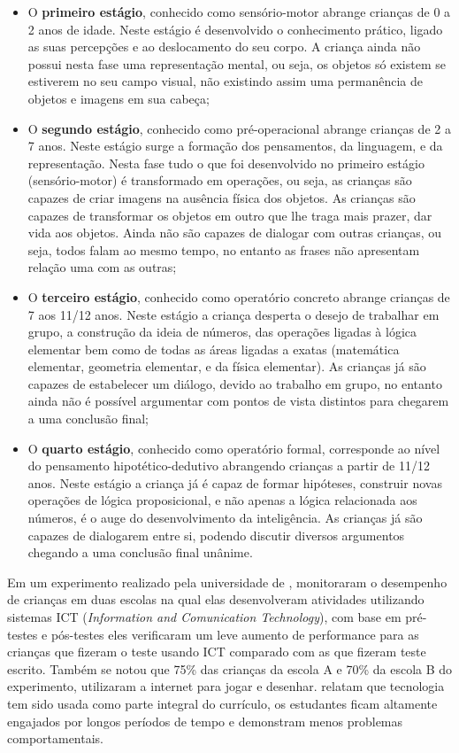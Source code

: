 \begin{itemize}
	\item O \textbf{primeiro estágio}, conhecido como sensório-motor abrange crianças de 0 a 2 anos de idade. Neste estágio
	é desenvolvido o conhecimento prático, ligado as suas percepções e ao deslocamento do seu corpo. A criança ainda não
	possui nesta fase uma representação mental, ou seja, os objetos só existem se estiverem no seu campo visual, não existindo
	assim uma permanência de objetos e imagens em sua cabeça;

	\item O \textbf{segundo estágio}, conhecido como pré-operacional abrange crianças de 2 a 7 anos. Neste estágio surge
	a formação dos pensamentos, da linguagem, e da representação. Nesta fase tudo o que foi desenvolvido no primeiro estágio
	(sensório-motor) é transformado em operações, ou seja, as crianças são capazes de criar imagens na ausência física dos
	objetos. As crianças são capazes de transformar os objetos em outro que lhe traga mais prazer, dar vida aos objetos. Ainda
	não são capazes de dialogar com outras crianças, ou seja, todos falam ao mesmo tempo, no entanto as frases não apresentam
	relação uma com as outras;

	\item O \textbf{terceiro estágio}, conhecido como operatório concreto abrange crianças de 7 aos 11/12 anos. Neste estágio
	a criança desperta o desejo de trabalhar em grupo, a construção da ideia de números, das operações ligadas à lógica elementar
	bem como de todas as áreas ligadas a exatas (matemática elementar, geometria elementar, e da física elementar). As crianças
	já são capazes de estabelecer um diálogo, devido ao trabalho em grupo, no entanto ainda não é possível argumentar com
	pontos de vista distintos para chegarem a uma conclusão final;

	\item O \textbf{quarto estágio}, conhecido como operatório formal, corresponde ao nível do pensamento hipotético-dedutivo
	abrangendo crianças a partir de 11/12 anos. Neste estágio a criança já é capaz de formar hipóteses, construir novas operações 
	de lógica proposicional, e não apenas a lógica relacionada aos números, é o auge do desenvolvimento da inteligência. As 
	crianças já são capazes de dialogarem entre si, podendo discutir diversos argumentos chegando a uma conclusão final unânime.
\end{itemize}

Em um experimento realizado pela universidade de , monitoraram o desempenho de crianças em duas escolas
na qual elas desenvolveram atividades utilizando sistemas ICT (\textit{Information and Comunication Technology}), com base em pré-testes
e pós-testes eles verificaram um leve aumento de performance para as crianças que fizeram o teste usando ICT comparado com as que
fizeram teste escrito. Também se notou que 75\% das crianças da escola A e 70\% da escola B do experimento, utilizaram a internet
para jogar e desenhar. relatam que tecnologia tem sido usada como parte integral do currículo, os estudantes 
ficam altamente engajados por longos períodos de tempo e demonstram menos problemas comportamentais. 

